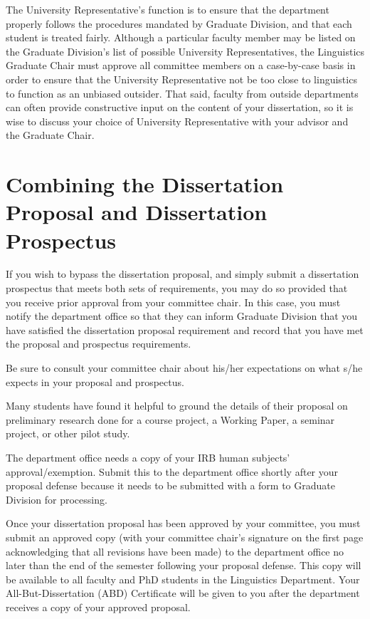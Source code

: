 \documentclass[
]{book}
\begin{document}
The University Representative's function is to ensure that the department properly follows the procedures mandated by Graduate Division, and that each student is treated fairly. Although a particular faculty member may be listed on the Graduate Division's list of possible University Representatives, the Linguistics Graduate Chair must approve all committee members on a case-by-case basis in order to ensure that the University Representative not be too close to linguistics to function as an unbiased outsider. That said, faculty from outside departments can often provide constructive input on the content of your dissertation, so it is wise to discuss your choice of University Representative with your advisor and the Graduate Chair.

\section{Combining the Dissertation Proposal and Dissertation Prospectus}\label{combining-the-dissertation-proposal-and-dissertation-prospectus}

If you wish to bypass the dissertation proposal, and simply submit a dissertation prospectus that meets both sets of requirements, you may do so provided that you receive prior approval from your committee chair. In this case, you must notify the department office so that they can inform Graduate Division that you have satisfied the dissertation proposal requirement and record that you have met the proposal and prospectus requirements.

Be sure to consult your committee chair about his/her expectations on what s/he expects in your proposal and prospectus.

Many students have found it helpful to ground the details of their proposal on preliminary research done for a course project, a Working Paper, a seminar project, or other pilot study.

The department office needs a copy of your IRB human subjects' approval/exemption. Submit this to the department office shortly after your proposal defense because it needs to be submitted with a form to Graduate Division for processing.

Once your dissertation proposal has been approved by your committee, you must submit an approved copy (with your committee chair's signature on the first page acknowledging that all revisions have been made) to the department office no later than the end of the semester following your proposal defense. This copy will be available to all faculty and PhD students in the Linguistics Department. Your All-But-Dissertation (ABD) Certificate will be given to you after the department receives a copy of your approved proposal.
\end{document}
